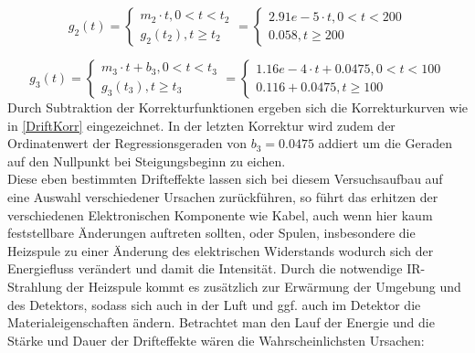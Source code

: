 \documentclass{article}
\begin{document}
            \begin{equation}
                g_2(t)=
                \begin{cases}
                    m_2\cdot t, 0<t<t_2\\
                    g_2(t_2),t\geq t_2
                \end{cases}
                = 
                \begin{cases}
                    2.91e-5\cdot t, 0<t<200\\
                    0.058,t\geq 200
                \end{cases}
            \end{equation}

            \begin{equation}
                g_3(t)=
                \begin{cases}
                    m_3\cdot t + b_3, 0<t<t_3\\
                    g_3(t_3),t\geq t_3
                \end{cases}
                = 
                \begin{cases}
                    1.16e-4\cdot t+0.0475, 0<t<100\\
                    0.116+0.0475,t\geq 100
                \end{cases}
            \end{equation}
            Durch Subtraktion der Korrekturfunktionen ergeben sich die Korrekturkurven wie in
            \ref{DriftKorr} eingezeichnet. In der letzten Korrektur wird zudem der Ordinatenwert
            der Regressionsgeraden von $b_3=0.0475$ addiert um die Geraden auf den Nullpunkt bei
            Steigungsbeginn zu eichen. \\
            Diese eben bestimmten Drifteffekte lassen sich bei diesem Versuchsaufbau auf eine Auswahl
            verschiedener Ursachen zurückführen, so führt das erhitzen der verschiedenen Elektronischen
            Komponente wie Kabel, auch wenn hier kaum feststellbare Änderungen auftreten sollten, oder
            Spulen, insbesondere die Heizspule zu einer Änderung des elektrischen Widerstands wodurch
            sich der Energiefluss verändert und damit die Intensität. Durch die notwendige
            IR-Strahlung der Heizspule kommt es zusätzlich zur Erwärmung der Umgebung und des Detektors,
            sodass sich auch in der Luft und ggf. auch im Detektor die Materialeigenschaften ändern.
            Betrachtet man den Lauf der Energie und die Stärke und Dauer der Drifteffekte wären die Wahrscheinlichsten Ursachen:
\end{document}
